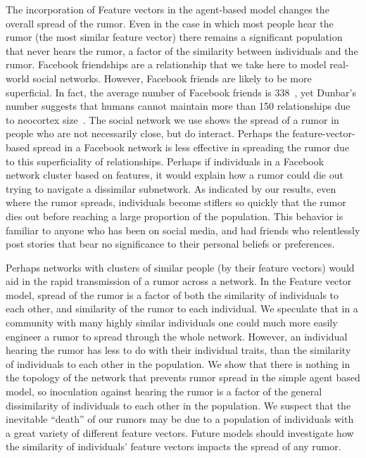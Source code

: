 The incorporation of Feature vectors in the agent-based model changes the overall spread of the rumor.
Even in the case in which most people hear the rumor (the most similar feature vector) there remains a significant population that never hears the rumor, a factor of the similarity between individuals and the rumor.
Facebook friendships are a relationship that we take here to model real-world social networks.
However, Facebook friends are likely to be more superficial.
In fact, the average number of Facebook friends is 338~\cite{smith-2014}, yet Dunbar's number suggests that humans cannot maintain more than 150 relationships due to neocortex size~\cite{dunbar-1992}.
The social network we use shows the spread of a rumor in people who are not necessarily close, but do interact.
Perhaps the feature-vector-based spread in a Facebook network is less effective in spreading the rumor due to this superficiality of relationships.
Perhaps if individuals in a Facebook network cluster based on features, it would explain how a rumor could die out trying to navigate a dissimilar subnetwork.
As indicated by our results, even where the rumor spreads, individuals become stiflers so quickly that the rumor dies out before reaching a large proportion of the population.
This behavior is familiar to anyone who has been on social media, and had friends who relentlessly post stories that bear no significance to their personal beliefs or preferences.


Perhaps networks with clusters of similar people (by their feature vectors) would aid in the rapid transmission of a rumor across a network.
In the Feature vector model, spread of the rumor is a factor of both the similarity of individuals to each other, and similarity of the rumor to each individual.
We speculate that in a community with many highly similar individuals one could much more easily engineer a rumor to spread through the whole network.
However, an individual hearing the rumor has less to do with their individual traits, than the similarity of individuals to each other in the population.
We show that there is nothing in the topology of the network that prevents rumor spread in the simple agent based model, so inoculation against hearing the rumor is a factor of the general dissimilarity of individuals to each other in the population.
We suspect that the inevitable ``death'' of our rumors may be due to a population of individuals with a great variety of different feature vectors.
Future models should investigate how the similarity of individuals' feature vectors impacts the spread of any rumor.


